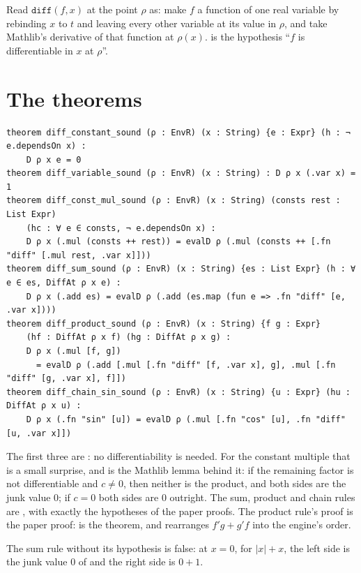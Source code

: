 Read $\texttt{diff}(f, x)$ at the point $\rho$ as: make $f$ a function of one real variable by
rebinding $x$ to $t$ and leaving every other variable at its value in $\rho$, and take Mathlib's
derivative of that function at $\rho(x)$.  is the hypothesis ``$f$ is differentiable
in $x$ at $\rho$''.

\section{The theorems}

\begin{verbatim}
theorem diff_constant_sound (ρ : EnvR) (x : String) {e : Expr} (h : ¬ e.dependsOn x) :
    D ρ x e = 0
theorem diff_variable_sound (ρ : EnvR) (x : String) : D ρ x (.var x) = 1
theorem diff_const_mul_sound (ρ : EnvR) (x : String) (consts rest : List Expr)
    (hc : ∀ e ∈ consts, ¬ e.dependsOn x) :
    D ρ x (.mul (consts ++ rest)) = evalD ρ (.mul (consts ++ [.fn "diff" [.mul rest, .var x]]))
theorem diff_sum_sound (ρ : EnvR) (x : String) {es : List Expr} (h : ∀ e ∈ es, DiffAt ρ x e) :
    D ρ x (.add es) = evalD ρ (.add (es.map (fun e => .fn "diff" [e, .var x])))
theorem diff_product_sound (ρ : EnvR) (x : String) {f g : Expr}
    (hf : DiffAt ρ x f) (hg : DiffAt ρ x g) :
    D ρ x (.mul [f, g])
      = evalD ρ (.add [.mul [.fn "diff" [f, .var x], g], .mul [.fn "diff" [g, .var x], f]])
theorem diff_chain_sin_sound (ρ : EnvR) (x : String) {u : Expr} (hu : DiffAt ρ x u) :
    D ρ x (.fn "sin" [u]) = evalD ρ (.mul [.fn "cos" [u], .fn "diff" [u, .var x]])
\end{verbatim}

The first three are : no differentiability is needed. For the constant multiple
that is a small surprise, and  is the Mathlib lemma behind it: if the
remaining factor is not differentiable and $c \neq 0$, then neither is the product, and both
sides are the junk value $0$; if $c = 0$ both sides are $0$ outright. The sum, product and chain
rules are , with exactly the hypotheses of the paper proofs. The product
rule's proof is the paper proof:  is the theorem, and
 rearranges $f'g + g'f$ into the engine's order.

\begin{thmbox}
  The sum rule without its hypothesis is false: at $x = 0$, for $|x| + x$, the left side is
  the junk value $0$ of  and the right side is $0 + 1$.
\end{thmbox}

